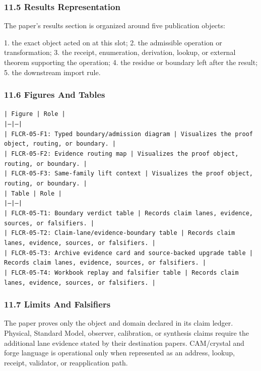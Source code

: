 \documentclass[11pt]{article}
\begin{document}
\subsubsection*{11.5 Results Representation}

The paper's results section is organized around five publication objects:

1. the exact object acted on at this slot;
2. the admissible operation or transformation;
3. the receipt, enumeration, derivation, lookup, or external theorem supporting
   the operation;
4. the residue or boundary left after the result;
5. the downstream import rule.

\subsubsection*{11.6 Figures And Tables}

\noindent\texttt{| Figure | Role |}\\
\noindent\texttt{|---|---|}\\
\noindent\texttt{| FLCR-05-F1: Typed boundary/admission diagram | Visualizes the proof object, routing, or boundary. |}\\
\noindent\texttt{| FLCR-05-F2: Evidence routing map | Visualizes the proof object, routing, or boundary. |}\\
\noindent\texttt{| FLCR-05-F3: Same-family lift context | Visualizes the proof object, routing, or boundary. |}\\

\noindent\texttt{| Table | Role |}\\
\noindent\texttt{|---|---|}\\
\noindent\texttt{| FLCR-05-T1: Boundary verdict table | Records claim lanes, evidence, sources, or falsifiers. |}\\
\noindent\texttt{| FLCR-05-T2: Claim-lane/evidence-boundary table | Records claim lanes, evidence, sources, or falsifiers. |}\\
\noindent\texttt{| FLCR-05-T3: Archive evidence card and source-backed upgrade table | Records claim lanes, evidence, sources, or falsifiers. |}\\
\noindent\texttt{| FLCR-05-T4: Workbook replay and falsifier table | Records claim lanes, evidence, sources, or falsifiers. |}\\

\subsubsection*{11.7 Limits And Falsifiers}

The paper proves only the object and domain declared in its claim ledger.
Physical, Standard Model, observer, calibration, or synthesis claims require
the additional lane evidence stated by their destination papers. CAM/crystal
and forge language is operational only when represented as an address, lookup,
receipt, validator, or reapplication path.
\end{document}
